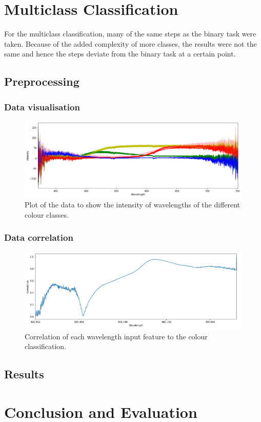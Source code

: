 \documentclass{article}
\begin{document}
\section{Multiclass Classification}
For the multiclass classification, many of the same steps as the binary task were taken. Because of the added complexity of more classes, the results were not the same and hence the steps deviate from the binary task at a certain point. 

\subsection{Preprocessing}

\subsubsection{Data visualisation}

\begin{figure}[H]
\centering
\includegraphics[width=1\textwidth, keepaspectratio]{imgs/multiclass-visual.png}
\caption{Plot of the data to show the intensity of wavelengths of the different colour classes.}
\end{figure}

\subsubsection{Data correlation}

\begin{figure}[H]
\centering
\includegraphics[width=1\textwidth, keepaspectratio]{imgs/multiclass-correlation.png}
\caption{Correlation of each wavelength input feature to the colour classification.}
\end{figure}

\subsection{Results}

\section{Conclusion and Evaluation}

\end{document}
